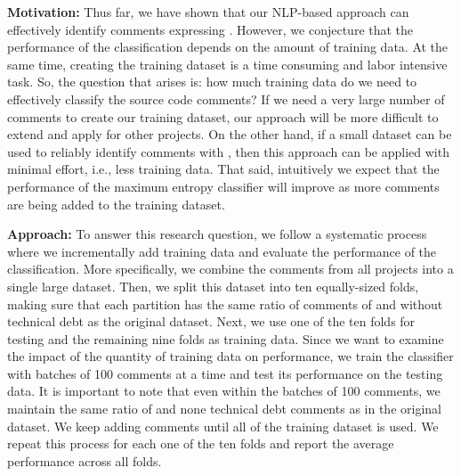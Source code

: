 

\vspace{3mm}
\noindent\chapterIVrqiii
\vspace{3mm}

\noindent \textbf{Motivation:} Thus far, we have shown that our NLP-based approach can effectively identify comments expressing \SATD. However, we conjecture that the performance of the classification depends on the amount of training data. At the same time, creating the training dataset is a time consuming and labor intensive task. So, the question that arises is: how much training data do we need to effectively classify the source code comments? If we need a very large number of comments to create our training dataset, our approach will be more difficult to extend and apply for other projects. On the other hand, if a small dataset can be used to reliably identify comments with \SATD, then this approach can be applied with minimal effort, i.e., less training data. That said, intuitively we expect that the performance of the maximum entropy classifier will improve as more comments are being added to the training dataset.

\noindent \textbf{Approach:} To answer this research question, we follow a systematic process where we incrementally add training data and evaluate the performance of the classification.
More specifically, we combine the comments from all projects into a single large dataset. Then, we split this dataset into ten equally-sized folds, making sure that each partition has the same ratio of comments of \SATD and without technical debt as the original dataset. Next, we use one of the ten folds for testing and the remaining nine folds as training data. Since we want to examine the impact of the quantity of training data on performance, we train the classifier with batches of 100 comments at a time and test its performance on the testing data. It is important to note that even within the batches of 100 comments, we maintain the same ratio of \SATD and none technical debt comments as in the original dataset. We keep adding comments until all of the training dataset is used. We repeat this process for each one of the ten folds and report the average performance across all folds.

